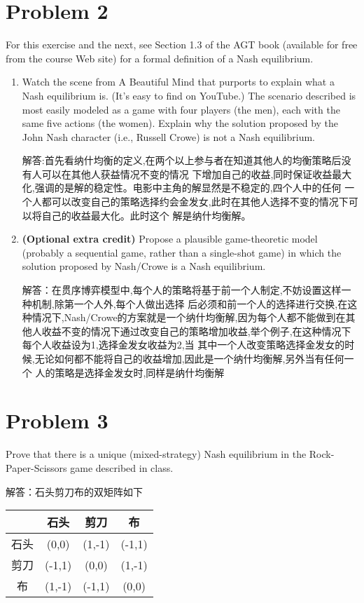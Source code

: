 \documentclass{article}
\begin{document}
\section*{Problem 2}
For this exercise and the next, see Section 1.3 of the AGT book (available for free from the course Web site)
for a formal definition of a Nash equilibrium.
\begin{enumerate}
\item %
Watch the scene from A Beautiful Mind that purports to explain what a Nash equilibrium is. (It’s
easy to find on YouTube.) The scenario described is most easily modeled as a game with four players
(the men), each with the same five actions (the women). Explain why the solution proposed by the
John Nash character (i.e., Russell Crowe) is not a Nash equilibrium.

解答:首先看纳什均衡的定义,在两个以上参与者在知道其他人的均衡策略后没有人可以在其他人获益情况不变的情况
下增加自己的收益,同时保证收益最大化,强调的是解的稳定性。电影中主角的解显然是不稳定的,四个人中的任何
一个人都可以改变自己的策略选择约会金发女,此时在其他人选择不变的情况下可以将自己的收益最大化。此时这个
解是纳什均衡解。
\item %
\textbf{(Optional extra credit)} Propose a plausible game-theoretic model (probably a sequential game,
rather than a single-shot game) in which the solution proposed by Nash/Crowe is a Nash equilibrium.

解答：在贯序博弈模型中,每个人的策略将基于前一个人制定,不妨设置这样一种机制,除第一个人外,每个人做出选择
后必须和前一个人的选择进行交换,在这种情况下,Nash/Crowe的方案就是一个纳什均衡解,因为每个人都不能做到在其
他人收益不变的情况下通过改变自己的策略增加收益,举个例子,在这种情况下每个人收益设为1,选择金发女收益为2,当
其中一个人改变策略选择金发女的时候,无论如何都不能将自己的收益增加,因此是一个纳什均衡解,另外当有任何一个
人的策略是选择金发女时,同样是纳什均衡解
\end{enumerate}

\section*{Problem 3}
Prove that there is a unique (mixed-strategy) Nash equilibrium in the Rock-Paper-Scissors game described
in class.

解答：石头剪刀布的双矩阵如下

\begin{tabular}{c|c|c|c}
\hline
&石头&剪刀&布\\
\hline
石头&(0,0)&(1,-1)&(-1,1)\\
\hline
剪刀&(-1,1)&(0,0)&(1,-1)\\
\hline
布&(1,-1)&(-1,1)&(0,0)\\
\hline
\end{tabular}
\end{document}
